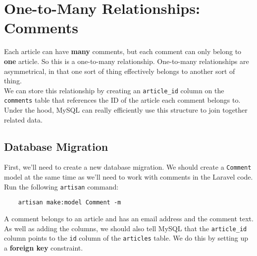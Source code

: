 \pagebreak


\section{One-to-Many Relationships: Comments}

Each article can have \textbf{many} comments, but each comment can only belong to \textbf{one} article. So this is a one-to-many relationship. One-to-many relationships are asymmetrical, in that one sort of thing effectively belongs to another sort of thing.
\\

We can store this relationship by creating an \texttt{article\_id} column on the \texttt{comments} table that references the ID of the article each comment belongs to. Under the hood, MySQL can really efficiently use this structure to join together related data.



\subsection{Database Migration}

First, we'll need to create a new database migration. We should create a \texttt{Comment} model at the same time as we'll need to work with comments in the Laravel code. Run the following \texttt{artisan} command:

\begin{verbatim}
    artisan make:model Comment -m
\end{verbatim}

A comment belongs to an article and has an email address and the comment text. As well as adding the columns, we should also tell MySQL that the \texttt{article\_id} column points to the \texttt{id} column of the \texttt{articles} table. We do this by setting up a \textbf{foreign key} constraint.

